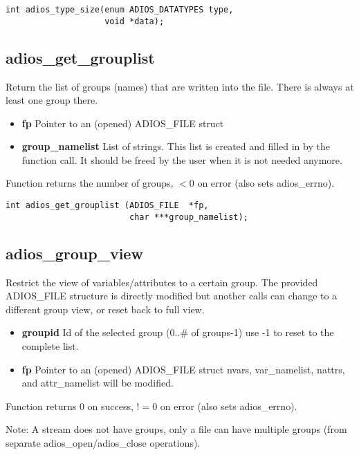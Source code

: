 \begin{lstlisting}[alsolanguage=C]
int adios_type_size(enum ADIOS_DATATYPES type, 
                    void *data);
\end{lstlisting}


\subsection{adios\_get\_grouplist}
Return the list of groups (names) that are written into
the file. There is always at least one group there.

\begin{itemize}
\item{\bf fp} Pointer to an (opened) ADIOS\_FILE struct
\item{\bf group\_namelist} List of strings. This list is created and filled in by the function call. It should be freed by the user when it is not needed anymore.
\end{itemize}

Function returns the number of groups, $<0$ on error (also sets adios\_errno).

\begin{lstlisting}[alsolanguage=C]
int adios_get_grouplist (ADIOS_FILE  *fp, 
                         char ***group_namelist);
\end{lstlisting}


\subsection{adios\_group\_view}
Restrict the view of variables/attributes to a certain group.
The provided ADIOS\_FILE structure is directly modified but
another calls can change to a different group view, or reset
back to full view.

\begin{itemize}
\item{\bf groupid} Id of the selected group (0..\# of groups-1) use -1 to reset to the complete list.
\item{\bf fp} Pointer to an (opened) ADIOS\_FILE struct nvars, var\_namelist, nattrs, and attr\_namelist will be modified.
\end{itemize}

Function returns 0 on success, $!=0$ on error (also sets adios\_errno).

Note: A stream does not have groups, only a file can have multiple groups 
(from separate adios\_open/adios\_close operations). 

